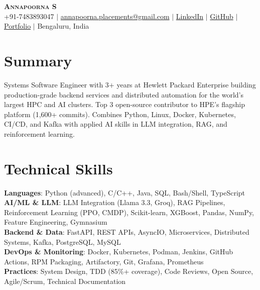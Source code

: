 \documentclass[letterpaper,10.5pt]{article}
\begin{document}
\begin{center}
    \textbf{\Huge \scshape Annapoorna S} \\ \vspace{2pt}
    \small +91-7483893047 $|$
    \href{mailto:annapoorna.placements@gmail.com}{annapoorna.placements@gmail.com} $|$
    \href{https://www.linkedin.com/in/annapoorna-s-a18b371a5/}{LinkedIn} $|$
    \href{https://github.com/annapoorna-s-alt}{GitHub} $|$
    \href{https://eloquent-cobbler-b0fb87.netlify.app}{Portfolio} $|$
    Bengaluru, India
\end{center}

\section{Summary}
\small{Systems Software Engineer with 3+ years at Hewlett Packard Enterprise building production-grade backend services and distributed automation for the world's largest HPC and AI clusters. Top 3 open-source contributor to HPE's flagship platform (1,600+ commits). Combines Python, Linux, Docker, Kubernetes, CI/CD, and Kafka with applied AI skills in LLM integration, RAG, and reinforcement learning.}

\section{Technical Skills}
\begin{itemize}[leftmargin=0.15in, label={}]
  \small{\item{
    \textbf{Languages}{: Python (advanced), C/C++, Java, SQL, Bash/Shell, TypeScript} \\
    \textbf{AI/ML \& LLM}{: LLM Integration (Llama 3.3, Groq), RAG Pipelines, Reinforcement Learning (PPO, CMDP), Scikit-learn, XGBoost, Pandas, NumPy, Feature Engineering, Gymnasium} \\
    \textbf{Backend \& Data}{: FastAPI, REST APIs, AsyncIO, Microservices, Distributed Systems, Kafka, PostgreSQL, MySQL} \\
    \textbf{DevOps \& Monitoring}{: Docker, Kubernetes, Podman, Jenkins, GitHub Actions, RPM Packaging, Artifactory, Git, Grafana, Prometheus} \\
    \textbf{Practices}{: System Design, TDD (85\%+ coverage), Code Reviews, Open Source, Agile/Scrum, Technical Documentation}
  }}
\end{itemize}
\end{document}
